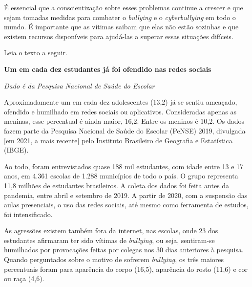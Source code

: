 É essencial que a conscientização sobre esses problemas continue a
crescer e que sejam tomadas medidas para combater o {\em bullying} e o
{\em cyberbullying} em todo o mundo. É importante que as vítimas saibam
que elas não estão sozinhas e que existem recursos disponíveis para
ajudá-las a superar essas situações difíceis.

Leia o texto a seguir.

\startblockquote
{\bf Um em cada dez estudantes já foi ofendido nas redes sociais}

{\em Dado é da Pesquisa Nacional de Saúde do Escolar}

Aproximadamente um em cada dez adolescentes (13,2) já se
sentiu ameaçado, ofendido e humilhado em redes sociais ou aplicativos.
Consideradas apenas as meninas, esse percentual é ainda maior,
16,2. Entre os meninos é 10,2. Os dados
fazem parte da Pesquisa Nacional de Saúde do Escolar (PeNSE) 2019,
divulgada {[}em 2021, a mais recente{]} pelo Instituto Brasileiro de
Geografia e Estatística (IBGE).

Ao todo, foram entrevistados quase 188 mil estudantes, com idade entre
13 e 17 anos, em 4.361 escolas de 1.288 municípios de todo o país. O
grupo representa 11,8 milhões de estudantes brasileiros. A coleta dos
dados foi feita antes da pandemia, entre abril e setembro de 2019. A
partir de 2020, com a suspensão das aulas presenciais, o uso das redes
sociais, até mesmo como ferramenta de estudos, foi intensificado.

As agressões existem também fora da internet, nas escolas, onde
23 dos estudantes afirmaram ter sido vítimas de
{\em bullying}, ou seja, sentiram-se humilhados por provocações feitas
por colegas nos 30 dias anteriores à pesquisa. Quando perguntados sobre
o motivo de sofrerem {\em bullying}, os três maiores percentuais foram
para aparência do corpo (16,5), aparência do rosto
(11,6) e cor ou raça (4,6).

\startplacefigure[location=leftmargin,title={Ao criar barreiras e afastamentos, o {\em bullying} é
prejudicial ao ambiente escolar como um
todo.}]
\stopplacefigure


